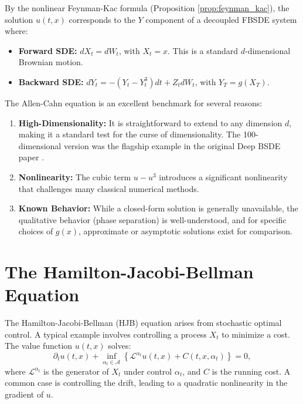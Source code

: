 \begin{proposition}
By the nonlinear Feynman-Kac formula (Proposition \ref{prop:feynman_kac}), the solution \(u(t,x)\) corresponds to the \(Y\) component of a decoupled FBSDE system where:
\begin{itemize}
    \item \textbf{Forward SDE:} \(dX_t = dW_t\), with \(X_t=x\). This is a standard \(d\)-dimensional Brownian motion.
    \item \textbf{Backward SDE:} \(dY_t = -(Y_t - Y_t^3)dt + Z_t dW_t\), with \(Y_T = g(X_T)\).
\end{itemize}
\end{proposition}

\begin{remark}
The Allen-Cahn equation is an excellent benchmark for several reasons:
\begin{enumerate}
    \item \textbf{High-Dimensionality:} It is straightforward to extend to any dimension \(d\), making it a standard test for the curse of dimensionality. The 100-dimensional version was the flagship example in the original Deep BSDE paper \cite{EHanJentzen2017}.
    \item \textbf{Nonlinearity:} The cubic term \(u-u^3\) introduces a significant nonlinearity that challenges many classical numerical methods.
    \item \textbf{Known Behavior:} While a closed-form solution is generally unavailable, the qualitative behavior (phase separation) is well-understood, and for specific choices of \(g(x)\), approximate or asymptotic solutions exist for comparison.
\end{enumerate}
\end{remark}

\section{The Hamilton-Jacobi-Bellman Equation}
\label{sec:hjb}

\begin{definition}
The Hamilton-Jacobi-Bellman (HJB) equation arises from stochastic optimal control. A typical example involves controlling a process \(X_t\) to minimize a cost. The value function \(u(t,x)\) solves:
\begin{equation}
    \partial_t u(t,x) + \inf_{\alpha_t \in \mathcal{A}} \left\{ \mathcal{L}^{\alpha_t} u(t,x) + C(t,x,\alpha_t) \right\} = 0,
\end{equation}
where \(\mathcal{L}^{\alpha_t}\) is the generator of \(X_t\) under control \(\alpha_t\), and \(C\) is the running cost. A common case is controlling the drift, leading to a quadratic nonlinearity in the gradient of \(u\).
\end{definition}

